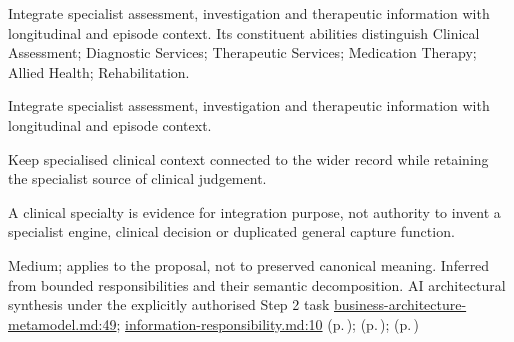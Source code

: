 Integrate specialist assessment, investigation and therapeutic information with longitudinal and episode context. Its constituent abilities distinguish Clinical Assessment; Diagnostic Services; Therapeutic Services; Medication Therapy; Allied Health; Rehabilitation.



Integrate specialist assessment, investigation and therapeutic information with longitudinal and episode context.



Keep specialised clinical context connected to the wider record while retaining the specialist source of clinical judgement.



A clinical specialty is evidence for integration purpose, not authority to invent a specialist engine, clinical decision or duplicated general capture function.


Medium; applies to the proposal, not to preserved canonical meaning.
Inferred from bounded responsibilities and their semantic decomposition. AI architectural synthesis under the explicitly authorised Step 2 task \hyperref[evidence:4bac85accd34ce0b]{business-architecture-metamodel.md:49}; \hyperref[evidence:be61392fefb4bb10]{information-responsibility.md:10}
 (p.\,\pageref{cap:bec-diagnostic-administration});  (p.\,\pageref{cap:bec-medication-administration});  (p.\,\pageref{cap:bec-reviewed-clinical-service-dependency-management})
